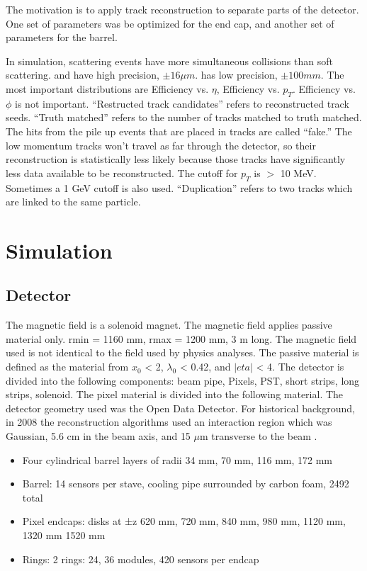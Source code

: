 \documentclass{article}
\newcommand{\pic}[2]{\beg{center}{\texttt{[image: \#2]}}}
\newcommand{\figpic}[3]{
\begin{figure}[H]
\begin{center}
\pic{#1}{#2}
\caption{#3}
\end{center}
\end{figure}}
\begin{document}
The motivation is to apply track reconstruction to separate parts of the detector. One set of parameters was be optimized for the end cap, and another set of parameters for the barrel. 


In simulation, scattering events have more simultaneous collisions than soft scattering.  and  have high precision, $\pm 16 \mu m$.  has low precision, $\pm 100 mm$. The most important distributions are Efficiency vs. $\eta$, Efficiency vs. $p_T$. Efficiency vs. $\phi$ is not important. ``Restructed track candidates'' refers to reconstructed track seeds. ``Truth matched'' refers to the number of tracks matched to truth matched. The hits from the pile up events that are placed in tracks are called ``fake.'' The low momentum tracks won't travel as far through the detector, so their reconstruction is statistically less likely because those tracks have significantly less data available to be reconstructed. The cutoff for $p_T$ is $>$ 10 MeV. Sometimes a 1 GeV cutoff is also used. ``Duplication'' refers to two tracks which are linked to the same particle.

\section{Simulation}

\subsection{Detector}

The magnetic field is a solenoid magnet. The magnetic field applies passive material only. rmin = 1160 mm, rmax = 1200 mm, 3 m long. The magnetic field used is not identical to the field used by physics analyses. The passive material is defined as the material from $x_0$ < 2, $\lambda_0$ < 0.42, and $|eta|$ < 4. The detector is divided into the following components: beam pipe, Pixels, PST, short strips, long strips, solenoid. The pixel material is divided into the following material. The detector geometry used was the Open Data Detector. For historical background, in 2008 the reconstruction algorithms used an interaction region which was Gaussian, 5.6 cm in the beam axis, and 15 $\mu$m transverse to the beam \cite{Piacquadio2008}.

\begin{itemize}
\item Four cylindrical barrel layers of radii 34 mm, 70 mm, 116 mm, 172 mm
\item Barrel: 14 sensors per stave, cooling pipe surrounded by carbon foam, 2492 total
\item Pixel endcaps: disks at ±z 620 mm, 720 mm, 840 mm, 980 mm, 1120 mm, 1320 mm 1520 mm
\item Rings: 2 rings: 24, 36 modules, 420 sensors per endcap
\end{itemize}
\end{document}
